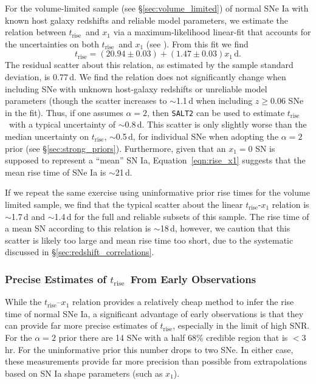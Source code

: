 \documentclass[twocolumn]{./aastex63}
\newcommand{\trise}{$t_\mathrm{rise}$}
\begin{document}
For the volume-limited sample (see \S\ref{sec:volume_limited}) of normal SNe
Ia with known host galaxy redshifts and reliable model parameters, we estimate
the relation between \trise\ and $x_1$ via a maximum-likelihood linear-fit
that accounts for the uncertainties on both \trise\ and $x_1$ (see
\citealt{Hogg10}). From this fit we find
%
\begin{equation}
    t_\mathrm{rise} = (20.94 \pm 0.03) + (1.47 \pm 0.03)x_1\,\mathrm{d}.
    \label{eqn:rise_x1}
\end{equation} 
%
The residual scatter about this relation, as estimated by the sample standard
deviation, is 0.77\,d. We find the relation does not significantly change when
including SNe with unknown host-galaxy redshifts or unreliable model
parameters (though the scatter increases to $\sim$1.1\,d when including $z \ge
0.06$ SNe in the fit). Thus, if one assumes $\alpha = 2$, then \texttt{SALT2}
can be used to estimate \trise\ with a typical uncertainty of $\sim$0.8\,d.
This scatter is only slightly worse than the median uncertainty on \trise,
$\sim$0.5\,d, for individual SNe when adopting the $\alpha = 2$ prior (see
\S\ref{sec:strong_priors}). Furthermore, given that an $x_1 = 0$ SN is
supposed to represent a ``mean'' SN Ia, Equation~\ref{eqn:rise_x1} suggests
that the mean rise time of SNe Ia is $\sim$21\,d.

If we repeat the same exercise using uninformative prior rise times for the
volume limited sample, we find that the typical scatter about the linear
\trise-$x_1$ relation is $\sim$1.7\,d and $\sim$1.4\,d for the full and
reliable subsets of this sample. The rise time of a mean SN according to this
relation is $\sim$18\,d, however, we caution that this scatter is likely too
large and mean rise time too short, due to the systematic discussed in
\S\ref{sec:redshift_correlations}.

\subsubsection{Precise Estimates of \trise\ From Early Observations}

While the \trise--$x_1$ relation provides a relatively cheap method to infer
the rise time of normal SNe Ia, a significant advantage of early observations
is that they can provide far more precise estimates of \trise, especially in
the limit of high SNR. For the $\alpha = 2$ prior there are 14 SNe with a half
68\% credible region that is $< 3$\,hr. For the uninformative prior this
number drops to two SNe. In either case, these measurements provide far more
precision than possible from extrapolations based on SN Ia shape parameters
(such as $x_1$).
\end{document}
